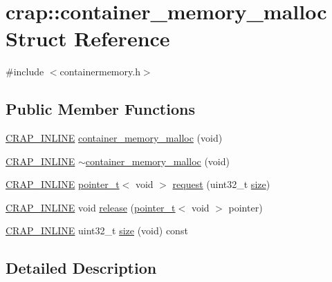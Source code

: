 \hypertarget{structcrap_1_1container__memory__malloc}{}\section{crap\+:\+:container\+\_\+memory\+\_\+malloc Struct Reference}
\label{structcrap_1_1container__memory__malloc}


{\ttfamily \#include $<$containermemory.\+h$>$}

\subsection*{Public Member Functions}
\begin{DoxyCompactItemize}
\item 
\hyperlink{config__x86_8h_a5a40526b8d842e7ff731509998bb0f1c}{C\+R\+A\+P\+\_\+\+I\+N\+L\+I\+N\+E} \hyperlink{structcrap_1_1container__memory__malloc_a69f8f4a94204563a6487b38b4480ad07}{container\+\_\+memory\+\_\+malloc} (void)
\item 
\hyperlink{config__x86_8h_a5a40526b8d842e7ff731509998bb0f1c}{C\+R\+A\+P\+\_\+\+I\+N\+L\+I\+N\+E} \hyperlink{structcrap_1_1container__memory__malloc_a9ce2198c89a65dd4cc6f4e0dbc46541c}{$\sim$container\+\_\+memory\+\_\+malloc} (void)
\item 
\hyperlink{config__x86_8h_a5a40526b8d842e7ff731509998bb0f1c}{C\+R\+A\+P\+\_\+\+I\+N\+L\+I\+N\+E} \hyperlink{structcrap_1_1pointer__t}{pointer\+\_\+t}$<$ void $>$ \hyperlink{structcrap_1_1container__memory__malloc_ad0a8feed933d368e334589fc7ca30fa8}{request} (uint32\+\_\+t \hyperlink{structcrap_1_1container__memory__malloc_a285d0358030a97833d9af2e6487ceb02}{size})
\item 
\hyperlink{config__x86_8h_a5a40526b8d842e7ff731509998bb0f1c}{C\+R\+A\+P\+\_\+\+I\+N\+L\+I\+N\+E} void \hyperlink{structcrap_1_1container__memory__malloc_a9fa8599831b9341479ecf58ef398931e}{release} (\hyperlink{structcrap_1_1pointer__t}{pointer\+\_\+t}$<$ void $>$ pointer)
\item 
\hyperlink{config__x86_8h_a5a40526b8d842e7ff731509998bb0f1c}{C\+R\+A\+P\+\_\+\+I\+N\+L\+I\+N\+E} uint32\+\_\+t \hyperlink{structcrap_1_1container__memory__malloc_a285d0358030a97833d9af2e6487ceb02}{size} (void) const 
\end{DoxyCompactItemize}


\subsection{Detailed Description}


